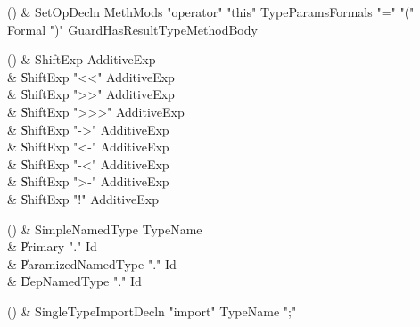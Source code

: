 \begin{bbgrammarappendix}

() & SetOpDecln \label{prod:SetOpDecln}  \: MethMods \xcd"operator" \xcd"this" TypeParams\opt Formals \xcd"=" \xcd"(" Formal  \xcd")" Guard\opt HasResultType\opt MethodBody  \\


\end{bbgrammarappendix}

\begin{bbgrammarappendix}

() & ShiftExp \label{prod:ShiftExp}  \: AdditiveExp  \\

 &    \| ShiftExp \xcd"<<" AdditiveExp \\
 &    \| ShiftExp \xcd">>" AdditiveExp \\
 &    \| ShiftExp \xcd">>>" AdditiveExp \\
 &    \| ShiftExp  \xcd"->" AdditiveExp  \\
 &    \| ShiftExp  \xcd"<-" AdditiveExp  \\
 &    \| ShiftExp  \xcd"-<" AdditiveExp  \\
 &    \| ShiftExp  \xcd">-" AdditiveExp  \\
 &    \| ShiftExp  \xcd"!" AdditiveExp  \\

\end{bbgrammarappendix}

\begin{bbgrammarappendix}

() & SimpleNamedType \label{prod:SimpleNamedType}  \: TypeName  \\

 &    \| Primary \xcd"." Id \\
 &    \| ParamizedNamedType \xcd"." Id \\
 &    \| DepNamedType \xcd"." Id \\

\end{bbgrammarappendix}

\begin{bbgrammarappendix}

() & SingleTypeImportDecln \label{prod:SingleTypeImportDecln}  \: \xcd"import" TypeName \xcd";"  \\


\end{bbgrammarappendix}

